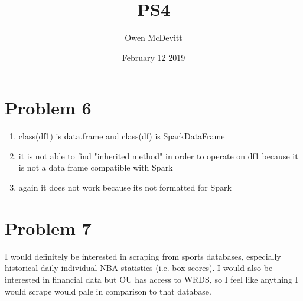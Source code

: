 \documentclass{article}
\title{PS4}
\author{Owen McDevitt}
\date{February 12 2019}
\begin{document}
\maketitle

\section{Problem 6}
\begin{enumerate}
    \addtocounter{enumi}{3}
    \item class(df1) is data.frame and class(df) is SparkDataFrame
    \item it is not able to find "inherited method" in order to operate on df1 because it is not a data frame compatible with Spark
    \item again it does not work because its not formatted for Spark
\end{enumerate}

\section{Problem 7}
    I would definitely be interested in scraping from sports databases, especially historical daily individual NBA statistics (i.e. box scores). I would also be interested in financial data but OU has access to WRDS, so I feel like anything I would scrape would pale in comparison to that database.
\end{document}
